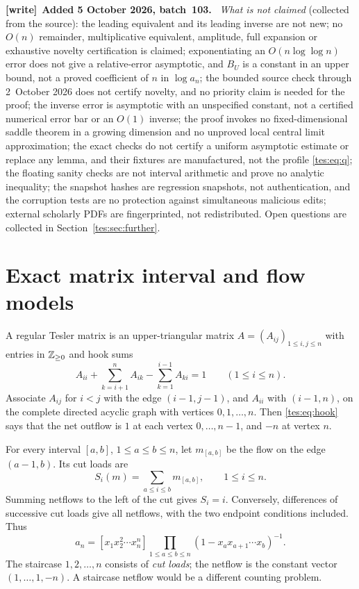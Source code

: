 \documentclass[11pt,a4paper]{article}
\theoremstyle{remark}\newtheorem{remark}[theorem]{Remark}
\numberwithin{equation}{section}
\newenvironment{writenote}[1][]{\par\smallskip\begingroup\small
 \noindent\textbf{[write]}\if\relax\detokenize{#1}\relax\else~\textbf{#1.}\fi\ }%
 {\par\endgroup\smallskip}
\begin{document}
\begin{writenote}[Added 5 October 2026, batch~103]
\emph{What is not claimed} (collected from the source): the leading
equivalent and its leading inverse are not new; no $O(n)$ remainder,
multiplicative equivalent, amplitude, full expansion or exhaustive novelty
certification is claimed; exponentiating an $O(n\log\log n)$ error does not
give a relative-error asymptotic, and $B_U$ is a constant in an upper
bound, not a proved coefficient of $n$ in $\log a_n$; the bounded source
check through 2~October 2026 does not certify novelty, and no priority claim
is needed for the proof; the inverse error is asymptotic with an unspecified
constant, not a certified numerical error bar or an $O(1)$ inverse; the
proof invokes no fixed-dimensional saddle theorem in a growing dimension
and no unproved local central limit approximation; the exact checks do not
certify a uniform asymptotic estimate or replace any lemma, and their
fixtures are manufactured, not the profile \eqref{tes:eq:q}; the floating
sanity checks are not interval arithmetic and prove no analytic inequality;
the snapshot hashes are regression snapshots, not authentication, and the
corruption tests are no protection against simultaneous malicious edits;
external scholarly PDFs are fingerprinted, not redistributed. Open
questions are collected in Section~\ref{tes:sec:further}.
\end{writenote}

\section{Exact matrix interval and flow models}\label{tes:sec:model}
A regular Tesler matrix is an upper-triangular matrix $A=(A_{ij})_{1\le i,j\le n}$ with entries in $\mathbb Z_{\ge0}$ and hook sums
\begin{equation}\label{tes:eq:hook}
A_{ii}+\sum_{k=i+1}^n A_{ik}-\sum_{k=1}^{i-1}A_{ki}=1
\qquad(1\le i\le n).
\end{equation}
Associate $A_{ij}$ for $i<j$ with the edge $(i-1,j-1)$, and $A_{ii}$ with $(i-1,n)$, on the complete directed acyclic graph with vertices $0,1,\ldots,n$. Then \eqref{tes:eq:hook} says that the net outflow is $1$ at each vertex $0,\ldots,n-1$, and $-n$ at vertex $n$.

For every interval $[a,b]$, $1\le a\le b\le n$, let $m_{[a,b]}$ be the flow on the edge $(a-1,b)$. Its cut loads are
\begin{equation}\label{tes:eq:cuts}
S_i(m)=\sum_{a\le i\le b}m_{[a,b]},\qquad 1\le i\le n.
\end{equation}
Summing netflows to the left of the cut gives $S_i=i$. Conversely, differences of successive cut loads give all netflows, with the two endpoint conditions included. Thus
\begin{equation}\label{tes:eq:coefficient}
a_n=[x_1x_2^2\cdots x_n^n]
\prod_{1\le a\le b\le n}(1-x_ax_{a+1}\cdots x_b)^{-1}.
\end{equation}
The staircase $1,2,\ldots,n$ consists of \emph{cut loads}; the netflow is the constant vector $(1,\ldots,1,-n)$. A staircase netflow would be a different counting problem.
\end{document}
